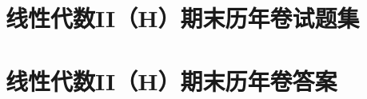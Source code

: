 \documentclass[
    geometry = 16k,
]{LALUbook}
\begin{document}
\chapter{线性代数II（H）期末历年卷试题集}





\chapter{线性代数II（H）期末历年卷答案}





\backmatter
\end{document}
